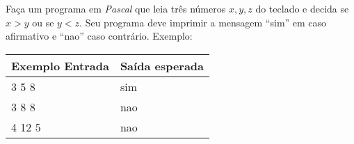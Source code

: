 
\item Faça um programa em \emph{Pascal} que leia três números $x, y, z$ 
do teclado e decida se $x > y$ ou se $y < z$. 
Seu programa deve imprimir a mensagem ``sim'' em caso afirmativo e  
``nao'' caso contrário. Exemplo:

\begin{center}
\begin{tabular}{|l|l|} \hline
Exemplo Entrada & Saída esperada \\ \hline
3 5 8                & sim                \\ \hline
3 8 8                & nao               \\ \hline
4 12 5               & nao               \\ \hline
\end{tabular}
\end{center}